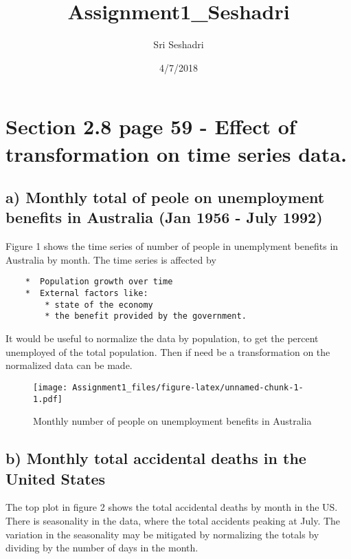\documentclass[]{article}
\title{Assignment1\_Seshadri}
\author{Sri Seshadri}
\date{4/7/2018}
\begin{document}
\maketitle

\section{Section 2.8 page 59 - Effect of transformation on time series
data.}\label{section-2.8-page-59---effect-of-transformation-on-time-series-data.}

\subsection{a) Monthly total of peole on unemployment benefits in
Australia (Jan 1956 - July
1992)}\label{a-monthly-total-of-peole-on-unemployment-benefits-in-australia-jan-1956---july-1992}

Figure 1 shows the time series of number of people in unemplyment
benefits in Australia by month. The time series is affected by

\begin{verbatim}
    *  Population growth over time
    *  External factors like:
        * state of the economy
        * the benefit provided by the government.
\end{verbatim}

It would be useful to normalize the data by population, to get the
percent unemployed of the total population. Then if need be a
transformation on the normalized data can be made.

\linebreak

\begin{figure}
\centering
\texttt{[image: Assignment1\_files/figure-latex/unnamed-chunk-1-1.pdf]}
\caption{Monthly number of people on unemployment benefits in Australia}
\end{figure}

\subsection{b) Monthly total accidental deaths in the United
States}\label{b-monthly-total-accidental-deaths-in-the-united-states}

The top plot in figure 2 shows the total accidental deaths by month in
the US. There is seasonality in the data, where the total accidents
peaking at July. The variation in the seasonality may be mitigated by
normalizing the totals by dividing by the number of days in the month.
\end{document}
